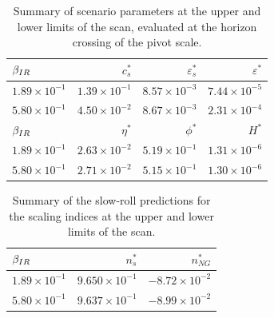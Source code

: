 \begin{table}[h!]
  \begin{center}
    \begin{tabular}{lrrr}
        \toprule
        $\beta_{IR}$ &    $c_s^{*}$ &  $\varepsilon_s^{*}$ &   $\varepsilon^{*}$ \\
        \midrule
        $1.89\times 10^{-1}$  &  $1.39\times 10^{-1}$  &  $  8.57\times 10^{-3}$  &  $7.44\times 10^{-5}$  \\
        $5.80\times 10^{-1}$  &  $4.50\times 10^{-2}$  &  $  8.67\times 10^{-3}$  &  $2.31\times 10^{-4}$  \\
        \bottomrule
        $\beta_{IR}$ &    $\eta^{*}$ &  $\phi^{*}$ &     $H^{*}$ \\
        \midrule
        $1.89\times 10^{-1}$  &  $2.63\times 10^{-2}$ &  $5.19\times 10^{-1}$  &  $1.31\times 10^{-6}$\\
        $5.80\times 10^{-1}$  &  $2.71\times 10^{-2}$ &  $5.15\times 10^{-1}$  &  $1.30\times 10^{-6}$\\
        \bottomrule
    \end{tabular}
    \caption{
        Summary of scenario parameters at the upper and lower limits of the scan, evaluated at the horizon
      crossing of the pivot scale.
      }\label{tab:scan_summary_sr}
  \end{center}
\end{table}




\begin{table}[h!]
  \begin{center}
    \begin{tabular}{lrr}
        \toprule
        $\beta_{IR}$ &  $n_s^{*}$ &  $n_{NG}^{*}$\\
        \midrule
        $1.89\times 10^{-1}$  &  $9.650\times 10^{-1}$  &  $-8.72\times 10^{-2}$\\
        $5.80\times 10^{-1}$  &  $9.637\times 10^{-1}$  &  $-8.99\times 10^{-2}$\\
        \bottomrule
    \end{tabular}
      \caption{
          Summary of the slow-roll predictions for the scaling indices
          at the upper and lower limits of the scan.
      }\label{tab:scan_summary_ns}
  \end{center}
\end{table}


